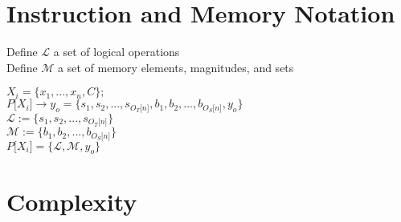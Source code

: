 \documentclass[11pt]{article}
\begin{document}
\section{Instruction and Memory Notation}
Define $\mathcal{L}$ a set of logical operations\\
Define $\mathcal{M}$ a set of memory elements, magnitudes, and sets
\begin{center}
$
X_i = \{x_1,...,x_n,C\};
$
\\ \vspace{2mm}
$
P \lbrack X_i \rbrack \rightarrow y_o = \{ s_1,s_2,...,s_{O_T \lbrack n \rbrack }, b_1, b_2,...,b_{O_S \lbrack n \rbrack},y_o \}
$
\\ \vspace{2mm}
$
\mathcal{L} := \{ s_1,s_2,...,s_{O_T \lbrack n \rbrack}\}
$
\\ \vspace{2mm}
$
\mathcal{M} := \{ b_1,b_2,...,b_{O_S \lbrack n \rbrack}\}
$
\\ \vspace{2mm}
$
P \lbrack X_i \rbrack = \{ \mathcal{L},\mathcal{M},y_o\}
$
\end{center}





















\section{Complexity}
\end{document}
